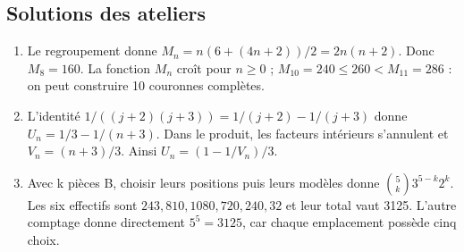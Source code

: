\subsection{Solutions des ateliers}
\begin{enumerate}
\item Le regroupement donne $M_n=n(6+(4n+2))/2=2n(n+2)$. Donc $M_8=160$. La fonction $M_n$ croît pour $n\geq0$ ; $M_{10}=240\leq260<M_{11}=286$ : on peut construire 10 couronnes complètes.
\item L'identité $1/((j+2)(j+3))=1/(j+2)-1/(j+3)$ donne $U_n=1/3-1/(n+3)$. Dans le produit, les facteurs intérieurs s'annulent et $V_n=(n+3)/3$. Ainsi $U_n=(1-1/V_n)/3$.
\item Avec k pièces B, choisir leurs positions puis leurs modèles donne $\binom5k3^{5-k}2^k$. Les six effectifs sont $243, 810, 1080, 720, 240, 32$ et leur total vaut 3125. L'autre comptage donne directement $5^5=3125$, car chaque emplacement possède cinq choix.
\end{enumerate}
